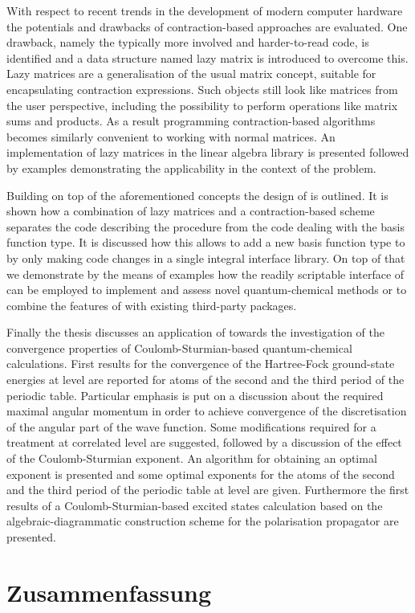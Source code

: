 With respect to recent trends in the development of modern computer hardware
the potentials and drawbacks of contraction-based approaches are evaluated.
One drawback, namely the typically more involved and harder-to-read code,
is identified and a data structure named lazy matrix is introduced
to overcome this.
Lazy matrices are a generalisation of the usual matrix concept,
suitable for encapsulating contraction expressions.
Such objects still look like matrices from the user perspective,
including the possibility to perform operations like matrix sums and products.
As a result programming contraction-based algorithms
becomes similarly convenient to working with normal matrices.
An implementation of lazy matrices in the \lazyten linear algebra library
is presented followed by examples
demonstrating the applicability in the context of the \HF problem.

Building on top of the aforementioned concepts the design of \molsturm is outlined.
It is shown how a combination of lazy matrices and a contraction-based \SCF scheme
separates the code describing the \SCF procedure
from the code dealing with the basis function type.
It is discussed how this allows to add a new basis function type
to \molsturm by only making code changes in a single integral interface library.
On top of that we demonstrate by the means of examples
how the readily scriptable interface of \molsturm
can be employed to implement and assess novel quantum-chemical methods
or to combine the features of \molsturm with existing third-party packages.

Finally the thesis discusses an application of \molsturm
towards the investigation of the convergence properties
of Coulomb-Sturmian-based quantum-chemical calculations.
First results for the convergence
of the Hartree-Fock ground-state energies at \HF level
are reported for atoms of the second and the third period
of the periodic table.
Particular emphasis is put on a discussion about the required
maximal angular momentum in order to achieve convergence
of the discretisation of the angular part of the wave function.
Some modifications required for a treatment at correlated level are suggested,
followed by a discussion of the effect of the Coulomb-Sturmian exponent.
An algorithm for obtaining an optimal exponent is presented
and some optimal exponents for the atoms of the
second and the third period of the periodic table at \HF level are given.
Furthermore the first results of a Coulomb-Sturmian-based excited
states calculation based on the algebraic-diagrammatic construction
scheme for the polarisation propagator are presented.


%
%
\chapter*{Zusammenfassung}
